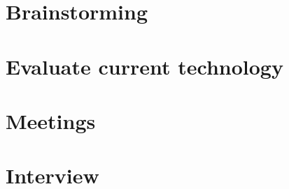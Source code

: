 \documentclass{report}
\begin{document}
\appendix

\chapter{Brainstorming}
\label{chapBrainstorming}



\chapter{Evaluate current technology}
\label{chapCurrentTechnology}


\chapter{Meetings}
\label{chapMeetings}


\chapter{Interview}
\label{chapInterview}

\end{document}
